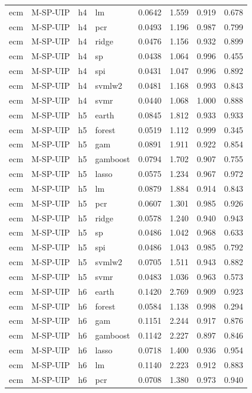 \begin{ThreePartTable}
\begin{longtable}[t]{llclcccc}
ecm & M-SP-UIP & h4 & lm & 0.0642 & 1.559 & 0.919 & 0.678\\
ecm & M-SP-UIP & h4 & pcr & 0.0493 & 1.196 & 0.987 & 0.799\\
ecm & M-SP-UIP & h4 & ridge & 0.0476 & 1.156 & 0.932 & 0.899\\
ecm & M-SP-UIP & h4 & sp & 0.0438 & 1.064 & 0.996 & 0.455\\
ecm & M-SP-UIP & h4 & spi & 0.0431 & 1.047 & 0.996 & 0.892\\
ecm & M-SP-UIP & h4 & svmlw2 & 0.0481 & 1.168 & 0.993 & 0.843\\
ecm & M-SP-UIP & h4 & svmr & 0.0440 & 1.068 & 1.000 & 0.888\\
\addlinespace
ecm & M-SP-UIP & h5 & earth & 0.0845 & 1.812 & 0.933 & 0.933\\
ecm & M-SP-UIP & h5 & forest & 0.0519 & 1.112 & 0.999 & 0.345\\
ecm & M-SP-UIP & h5 & gam & 0.0891 & 1.911 & 0.922 & 0.854\\
ecm & M-SP-UIP & h5 & gamboost & 0.0794 & 1.702 & 0.907 & 0.755\\
ecm & M-SP-UIP & h5 & lasso & 0.0575 & 1.234 & 0.967 & 0.972\\
ecm & M-SP-UIP & h5 & lm & 0.0879 & 1.884 & 0.914 & 0.843\\
ecm & M-SP-UIP & h5 & pcr & 0.0607 & 1.301 & 0.985 & 0.926\\
ecm & M-SP-UIP & h5 & ridge & 0.0578 & 1.240 & 0.940 & 0.943\\
ecm & M-SP-UIP & h5 & sp & 0.0486 & 1.042 & 0.968 & 0.633\\
ecm & M-SP-UIP & h5 & spi & 0.0486 & 1.043 & 0.985 & 0.792\\
ecm & M-SP-UIP & h5 & svmlw2 & 0.0705 & 1.511 & 0.943 & 0.882\\
ecm & M-SP-UIP & h5 & svmr & 0.0483 & 1.036 & 0.963 & 0.573\\
\addlinespace
ecm & M-SP-UIP & h6 & earth & 0.1420 & 2.769 & 0.909 & 0.923\\
ecm & M-SP-UIP & h6 & forest & 0.0584 & 1.138 & 0.998 & 0.294\\
ecm & M-SP-UIP & h6 & gam & 0.1151 & 2.244 & 0.917 & 0.876\\
ecm & M-SP-UIP & h6 & gamboost & 0.1142 & 2.227 & 0.897 & 0.846\\
ecm & M-SP-UIP & h6 & lasso & 0.0718 & 1.400 & 0.936 & 0.954\\
ecm & M-SP-UIP & h6 & lm & 0.1140 & 2.223 & 0.912 & 0.883\\
ecm & M-SP-UIP & h6 & pcr & 0.0708 & 1.380 & 0.973 & 0.940\\

\end{longtable}
\end{ThreePartTable}
